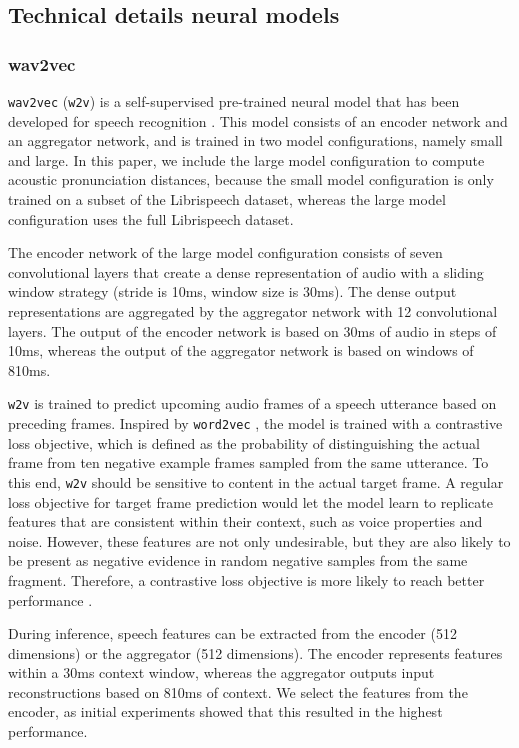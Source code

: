 \documentclass[11pt,a4paper]{article}
\begin{document}
\subsection{Technical details neural models}
\label{appendix:models}

\subsubsection{wav2vec}
\texttt{wav2vec} (\texttt{w2v}) is a self-supervised pre-trained neural model that has been developed for speech recognition \citep{schneider2019wav2vec}.
This model consists of an encoder network and an aggregator network, and is trained in two model configurations, namely small and large.
In this paper, we include the large model configuration to compute acoustic pronunciation distances, because the small model configuration is only trained on a subset of the Librispeech dataset, whereas the large model configuration uses the full Librispeech dataset.

The encoder network of the large model configuration consists of seven convolutional layers that create a dense representation of audio with a sliding window strategy (stride is 10ms, window size is 30ms).
The dense output representations are aggregated by the aggregator network with 12 convolutional layers.
The output of the encoder network is based on 30ms of audio in steps of 10ms, whereas the output of the aggregator network is based on windows of 810ms.

\texttt{w2v} is trained to predict upcoming audio frames of a speech utterance based on preceding frames.
Inspired by \texttt{word2vec} \citep{mikolov_distributed_2013}, the model is trained with a contrastive loss objective, which is defined as the probability of distinguishing the actual frame from ten negative example frames sampled from the same utterance.
To this end, \texttt{w2v} should be sensitive to content in the actual target frame.
A regular loss objective for target frame prediction would let the model learn to replicate features that are consistent within their context, such as voice properties and noise.
However, these features are not only undesirable, but they are also likely to be present as negative evidence in random negative samples from the same fragment.
Therefore, a contrastive loss objective is more likely to reach better performance
\citep{smith_contrastive_2005}.

During inference, speech features can be extracted from the encoder (512 dimensions) or the aggregator (512 dimensions).
The encoder represents features within a 30ms context window, whereas the aggregator outputs input reconstructions based on 810ms of context. We select the features from the encoder, as initial experiments showed that this resulted in the highest performance. 
\end{document}
